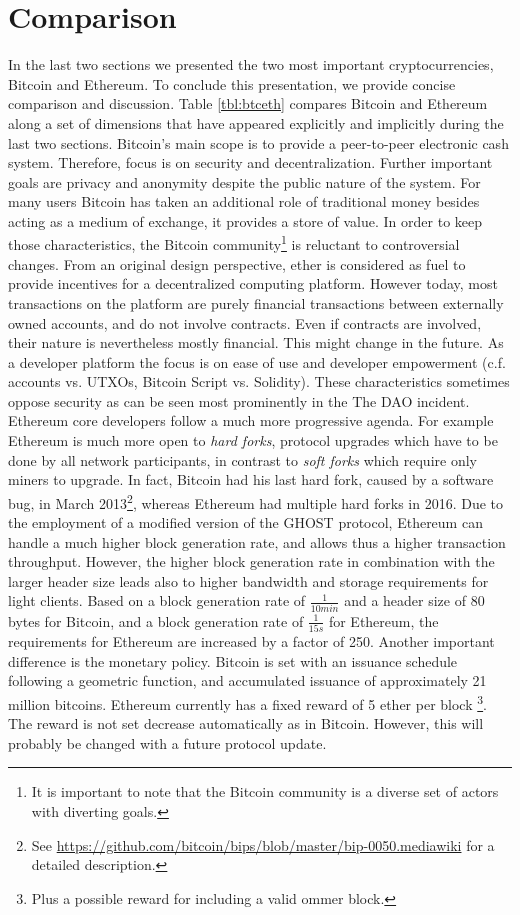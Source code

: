 \section{Comparison}

In the last two sections we presented the two most important cryptocurrencies, Bitcoin and Ethereum. 
To conclude this presentation, we provide concise comparison and discussion. Table \ref{tbl:btceth} compares Bitcoin and Ethereum along a set of dimensions that have appeared explicitly and implicitly during the last two sections. Bitcoin's main scope is to provide a peer-to-peer electronic cash system. Therefore, focus is on security and decentralization. Further important goals are privacy and anonymity despite the public nature of the system. For many users Bitcoin has taken an additional role of traditional money besides acting as a medium of exchange, it provides a store of value. In order to keep those characteristics, the Bitcoin community\footnote{It is important to note that the Bitcoin community is a diverse set of actors with diverting goals.} is reluctant to controversial changes. From an original design perspective, ether is considered as fuel to provide incentives for a decentralized computing platform. However today, most transactions on the platform are purely financial transactions between externally owned accounts, and do not involve contracts. Even if contracts are involved, their nature is nevertheless mostly financial. This might change in the future. As a developer platform the focus is on ease of use and developer empowerment (c.f. accounts vs. \ac{UTXO}s, Bitcoin Script vs. Solidity). These characteristics sometimes oppose security as can be seen most prominently in the The DAO incident. Ethereum core developers follow a much more progressive agenda. For example Ethereum is much more open to \emph{hard forks}, protocol upgrades which have to be done by all network participants, in contrast to \emph{soft forks} which require only miners to upgrade. In fact, Bitcoin had his last hard fork, caused by a software bug, in March 2013\footnote{See \url{https://github.com/bitcoin/bips/blob/master/bip-0050.mediawiki} for a detailed description.}, whereas Ethereum had multiple hard forks in 2016. 
Due to the employment of a modified version of the \ac{GHOST} protocol, Ethereum can handle a much higher block generation rate, and allows thus a higher transaction throughput. However, the higher block generation rate in combination with the larger header size leads also to higher bandwidth and storage requirements for light clients. Based on a block generation rate of $\frac{1}{10 min}$ and a header size of 80 bytes for Bitcoin, and a block generation rate of $\frac{1}{15 s}$ for Ethereum, the requirements for Ethereum are increased by a factor of 250. Another important difference is the monetary policy. Bitcoin is set with an issuance schedule following a geometric function, and accumulated issuance of approximately 21 million bitcoins. Ethereum currently has a fixed reward of 5 ether per block \parencite{ethmining}\footnote{Plus a possible reward for including a valid ommer block.}. The reward is not set decrease automatically as in Bitcoin. However, this will probably be changed with a future protocol update. 

